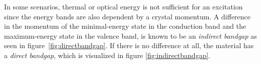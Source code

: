 In some scenarios, thermal or optical energy is not sufficient for an excitation since the energy bands are also dependent by a crystal momentum. A difference in the momentum of the minimal-energy state in the conduction band and the maximum-energy state in the valence band, is known to be an \textit{indirect bandgap} as seen in figure \ref{fig:directbandgap}. If there is no difference at all, the material has a \textit{direct bandgap}, which is visualized in figure \ref{fig:indirectbandgap}.









 \newpage
